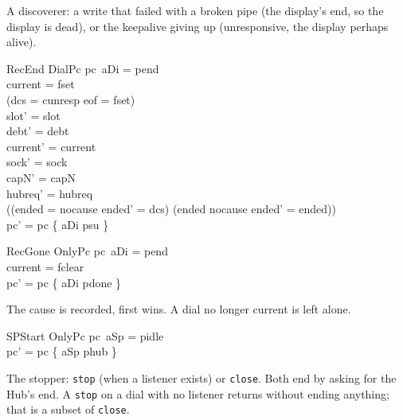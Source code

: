 \documentclass[a4paper,10pt,fleqn]{article}
\begin{document}
A discoverer: a write that failed with a broken pipe (the display's end, so the
display is dead), or the keepalive giving up (unresponsive, the display perhaps
alive).

\begin{schema}{RecEnd}
  DialPc
\where
  pc~aDi = pend \\
  current = fset \\
  (dcs = cunresp \lor eof = fset) \\
  slot' = slot \\
  debt' = debt \\
  current' = current \\
  sock' = sock \\
  capN' = capN \\
  hubreq' = hubreq \\
  ((ended = nocause \land ended' = dcs) \lor (ended \neq nocause \land ended' = ended)) \\
  pc' = pc \oplus \{ aDi \mapsto psu \}
\end{schema}

\begin{schema}{RecGone}
  OnlyPc
\where
  pc~aDi = pend \\
  current = fclear \\
  pc' = pc \oplus \{ aDi \mapsto pdone \}
\end{schema}

The cause is recorded, first wins.  A dial no longer current is left alone.

\begin{schema}{SPStart}
  OnlyPc
\where
  pc~aSp = pidle \\
  pc' = pc \oplus \{ aSp \mapsto phub \}
\end{schema}

The stopper: \texttt{stop} (when a listener exists) or \texttt{close}.  Both end
by asking for the Hub's end.  A \texttt{stop} on a dial with no listener
returns without ending anything; that is a subset of \texttt{close}.
\end{document}
